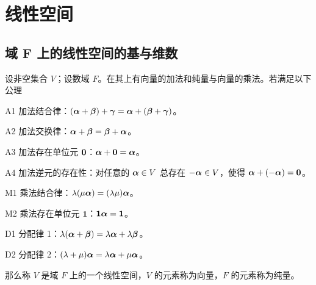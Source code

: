 \chapter{线性空间}

\section{域 F 上的线性空间的基与维数}

\begin{definition}
    设非空集合 $V$；设数域 $F$。在其上有向量的加法和纯量与向量的乘法。若满足以下公理

    A1 加法结合律：$(\aaa+\bbb) + \ggg = \aaa +(\bbb+\ggg)$。
    
    A2 加法交换律：$\aaa + \bbb = \bbb + \aaa$。
    
    A3 加法存在单位元 $\ling$：$\aaa + \ling = \aaa$。
    
    A4 加法逆元的存在性：对任意的 $\aaa \in V$ 总存在 $-\aaa\in V$，使得 $\aaa + (-\aaa) = \ling$。
    
    M1 乘法结合律：$\lambda(\mu \aaa) = (\lambda \mu) \aaa$。
    
    M2 乘法存在单位元 $\mathbf{1}$：$\mathbf{1} \aaa = \mathbf{1}$。
    
    D1 分配律 1：$\lambda(\aaa+\bbb) = \lambda \aaa + \lambda \bbb$。
    
    D2 分配律 2：$(\lambda + \mu)\aaa = \lambda \aaa + \mu \aaa$。

    那么称 $V$ 是域 $F$ 上的一个线性空间，$V$ 的元素称为向量，$F$ 的元素称为纯量。
\end{definition}
